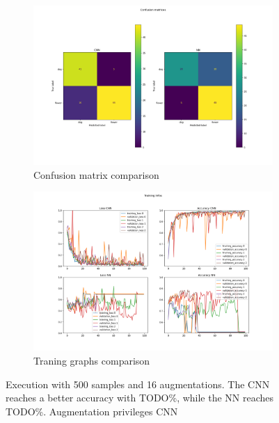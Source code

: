 \documentclass{report}
\begin{document}
\begin{figure}[t!]
  \centering
  \hspace{-2cm}
  \begin{subfigure}[t]{0.49\textwidth}
    \centering
    \includegraphics[width=1.3\textwidth]{10.500_aug16/conf_mat.png}
    \caption{Confusion matrix comparison}
    \label{fig:image-set6-sub1}
  \end{subfigure}
  \hfill
  \begin{subfigure}[t]{0.49\textwidth}
    \centering
    \includegraphics[width=1.3\textwidth]{10.500_aug16/training_infos.png}
    \caption{Traning graphs comparison}
    \label{fig:image-set6-sub2}
  \end{subfigure}

  \caption{Execution with 500 samples and 16 augmentations. The CNN reaches a better accuracy with TODO\%, while the NN reaches TODO\%. Augmentation privileges CNN}
  \label{fig:image-set6}
\end{figure}
\end{document}
